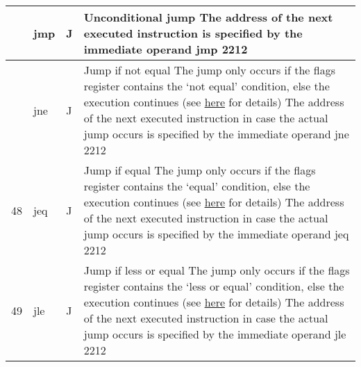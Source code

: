 \documentclass{article}
\newcommand{\St}[1]{{\fontfamily{qcr}\selectfont #1}}
\newcommand{\Ss}[1]{{\fontfamily{cmss}\selectfont #1}}
\begin{document}
{
\renewcommand{\arraystretch}{1.4}
\begin{table*}[h!]
\centering
\vspace{2mm}
\centering
\begin{tabular}{| >{\centering\arraybackslash} m{1cm} | >{\centering\arraybackslash} m{1.4cm} | >{\centering\arraybackslash} m{1.2cm} | m{11.6cm} |}

 \hline
 
 46 & \St{jmp} & \Ss{J} &
 
 Unconditional jump \newline
 The address of the next executed instruction is specified \newline
 by the immediate operand \newline
 \St{jmp 2212} \\
 
 \hline
 
 47 & \St{jne} & \Ss{J} &
 
 Jump if not equal \newline
 The jump only occurs if the \St{flags} register contains the \lq not equal\rq \newline
 condition, else the execution continues (see \hyperlink{flags:details}{here} for details) \newline
 The address of the next executed instruction in case the actual jump occurs \newline
 is specified by the immediate operand \newline
 \St{jne 2212} \\
 
 \hline
 
 48 & \St{jeq} & \Ss{J} &
 
 Jump if equal \newline
 The jump only occurs if the \St{flags} register contains the \lq equal\rq \newline
 condition, else the execution continues (see \hyperlink{flags:details}{here} for details) \newline
 The address of the next executed instruction in case the actual jump occurs \newline
 is specified by the immediate operand \newline
 \St{jeq 2212} \\
 
 \hline
 
 49 & \St{jle} & \Ss{J} &
 
 Jump if less or equal \newline
 The jump only occurs if the \St{flags} register contains the \lq less or equal\rq \newline
 condition, else the execution continues (see \hyperlink{flags:details}{here} for details) \newline
 The address of the next executed instruction in case the actual jump occurs \newline
 is specified by the immediate operand \newline
 \St{jle 2212} \\
 

\end{tabular}
\end{table*}}
\end{document}
